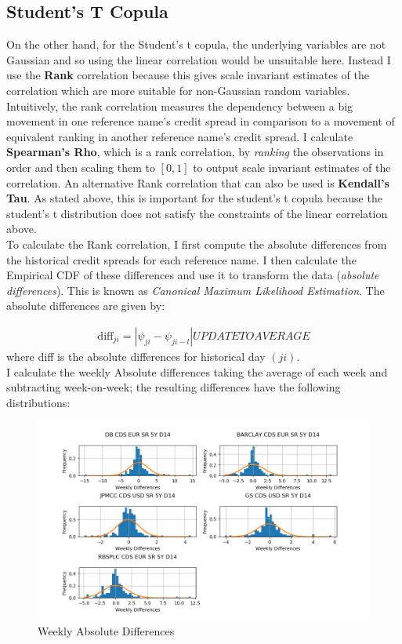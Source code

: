 \documentclass{report}
\theoremstyle{plain}
\theoremstyle{definition}
\begin{document}
\subsection{Student's T Copula}

On the other hand, for the Student's t copula, the underlying variables are not Gaussian and so using the linear correlation would be unsuitable here. Instead I use the \textbf{Rank} correlation because this gives scale invariant estimates of the correlation which are more suitable for non-Gaussian random variables. Intuitively, the rank correlation measures the dependency between a big movement in one reference name's credit spread in comparison to a movement of equivalent ranking in another reference name's credit spread. I calculate \textbf{Spearman's Rho}, which is a rank correlation, by \emph{ranking} the observations in order and then scaling them to $[0,1]$ to output scale invariant estimates of the correlation. An alternative Rank correlation that can also be used is \textbf{Kendall's Tau}. As stated above, this is important for the student's t copula because the student's t distribution does not satisfy the constraints of the linear correlation above. \\

To calculate the Rank correlation, I first compute the absolute differences from the historical credit spreads for each reference name. I then calculate the Empirical CDF of these differences and use it to transform the data (\textit{absolute differences}). This is known as \emph{Canonical Maximum Likelihood Estimation}. The absolute differences are given by:

\begin{align*}
\text{diff}_{ji} = |\psi_{ji} - \psi_{ji - l}| UPDATE TO AVERAGE
\end{align*}
where diff is the absolute differences for historical day $(ji)$.\\

I calculate the weekly Absolute differences taking the average of each week and subtracting week-on-week; the resulting differences have the following distributions:

\begin{figure}[H]
	\begin{center}
		\includegraphics[width=15cm]{Weekly_absolute_diffs.png}
		\caption{Weekly Absolute Differences} 
		\label{Weekly_absolute_diffs}
	\end{center}
\end{figure}
\end{document}
